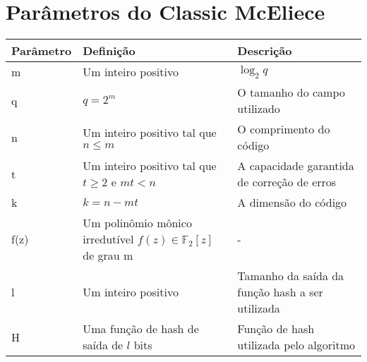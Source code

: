\section{Parâmetros do Classic McEliece}

\begin{table}[h]
\begin{tabularx}{\textwidth}{|X|X|X|}
\hline
\textbf{Parâmetro} & \textbf{Definição}                                                   & \textbf{Descrição}                              \\ \hline
m                  & Um inteiro positivo                                                  & $\log_2 q$                                      \\ \hline
q                  & $q = 2^m$                                                            & O tamanho do campo utilizado                    \\ \hline
n                  & Um inteiro positivo tal que $n \leq m$                               & O comprimento do código                         \\ \hline
t                  & Um inteiro positivo tal que $t \geq 2$ e $mt < n$                    & A capacidade garantida de correção de erros     \\ \hline
k                  & $k = n - mt$                                                         & A dimensão do código                            \\ \hline
f(z)               & Um polinômio mônico irredutível $f(z) \in \mathds{F}_2[z]$ de grau m & -                                               \\ \hline
l                  & Um inteiro positivo                                                  & Tamanho da saída da função hash a ser utilizada \\ \hline
H                  & Uma função de hash de saída de $l$ bits                              & Função de hash utilizada pelo algoritmo         \\ \hline
\end{tabularx}
\end{table}